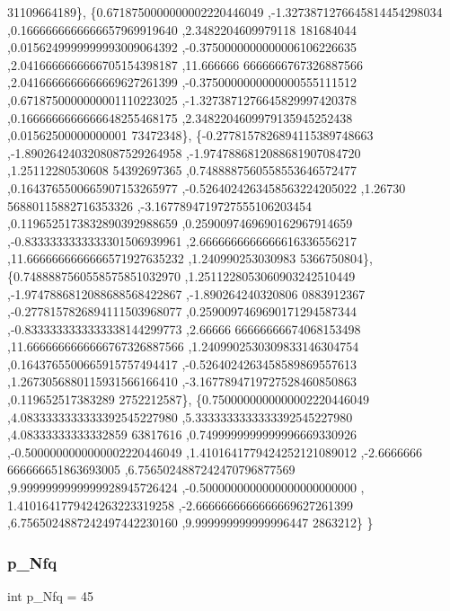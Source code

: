 \begin{DoxyCode}
      31109664189\},
\{0.6718750000000002220446049 ,-1.3273871276645814454298034 ,0.1666666666666657969919640 ,2.3482204609979118
      181684044 ,0.0156249999999993009064392 ,-0.3750000000000006106226635 ,2.0416666666666705154398187 ,11.666666
      6666666767326887566 ,2.0416666666666669627261399 ,-0.3750000000000000555111512 ,0.6718750000000001110223025 
      ,-1.3273871276645829997420378 ,0.1666666666666648255468175 ,2.3482204609979135945252438 ,0.01562500000000001
      73472348\},
\{-0.2778157826894115389748663 ,-1.8902642403208087529264958 ,-1.9747886812088681907084720 ,1.25112280530608
      54392697365 ,0.7488887560558553646572477 ,0.1643765500665907153265977 ,-0.5264024263458563224205022 ,1.26730
      56880115882716353326 ,-3.1677894719727555106203454 ,0.1196525173832890392988659 ,0.2590097469690162967914659
       ,-0.8333333333333301506939961 ,2.6666666666666616336556217 ,11.6666666666666571927635232 ,1.240990253030983
      5366750804\},
\{0.7488887560558575851032970 ,1.2511228053060903242510449 ,-1.9747886812088688568422867 ,-1.890264240320806
      0883912367 ,-0.2778157826894111503968077 ,0.2590097469690171294587344 ,-0.8333333333333338144299773 ,2.66666
      66666666674068153498 ,11.6666666666666767326887566 ,1.2409902530309833146304754 ,0.1643765500665915757494417
       ,-0.5264024263458589869557613 ,1.2673056880115931566166410 ,-3.1677894719727528460850863 ,0.119652517383289
      2752212587\},
\{0.7500000000000002220446049 ,4.0833333333333392545227980 ,5.3333333333333392545227980 ,4.08333333333332859
      63817616 ,0.7499999999999996669330926 ,-0.5000000000000002220446049 ,1.4101641779424252121089012 ,-2.6666666
      666666651863693005 ,6.7565024887242470796877569 ,9.9999999999999928945726424 ,-0.5000000000000000000000000 ,
      1.4101641779424263223319258 ,-2.6666666666666669627261399 ,6.7565024887242497442230160 ,9.999999999999996447
      2863212\}
\}
\end{DoxyCode}
\mbox{\label{a00996_aa030b0a9fe619a48647119bacea600e0}} 
\subsubsection{\texorpdfstring{p\+\_\+\+Nfq}{p\_Nfq}}
{\footnotesize\ttfamily int p\+\_\+\+Nfq = 45}

